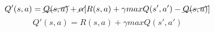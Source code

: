 \setlength\parindent{15pt}
\[
 Q'(s,a)
  = \cancel{Q(s,a)}
  + \cancel{\alpha}
  [ R(s,a)
  + \gamma
  maxQ(s',a')
  - \cancel{Q(s, a)}] 
\]
\[Q'(s,a) 
    = R(s,a) + \gamma maxQ(s',a')
\]
\setlength\parindent{0pt}